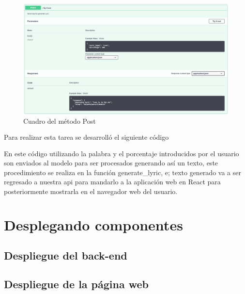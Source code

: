 \documentclass[12pt, a4paper, titlepage]{article}
\begin{document}
	\begin{figure}[H]
		\includegraphics[width=13.5cm]{./Imagenes/BackEnd/Post.png}
		\centering 
		\caption{Cuadro del método Post}
	\end{figure}
	Para realizar esta tarea se desarrolló el siguiente código
	\begin{center}
		
	\end{center}
	En este código utilizando la palabra y el porcentaje introducidos por el usuario son enviados al modelo para ser procesados generando así un texto, este procedimiento se realiza en la función generate\_lyric, e; texto generado va a ser regresado a nuestra api para mandarlo a la aplicación web en React para posteriormente mostrarla en el navegador web del usuario.
	\newpage
	\section{Desplegando componentes}
	
	\subsection{Despliegue del back-end}
	
	\subsection{Despliegue de la página web}
	
\end{document}
